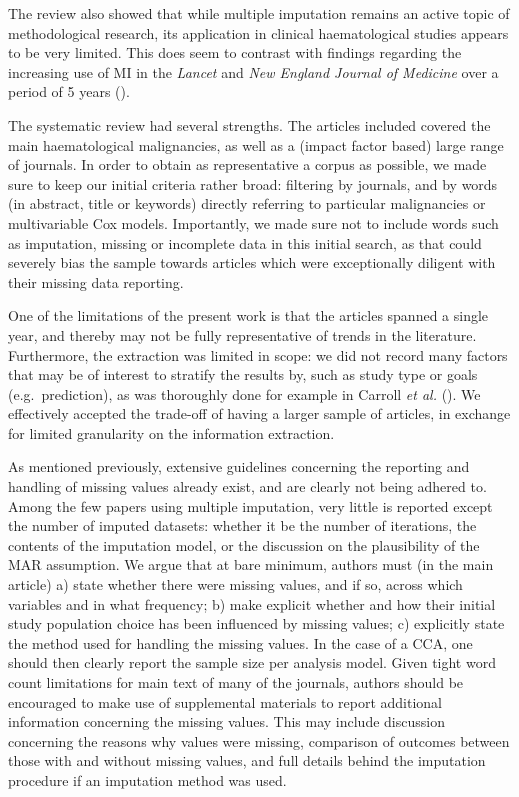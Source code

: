 \documentclass[
  letterpaper,
  paper=240mm:170mm,
  twoside=true,
  open=right,
  fontsize=10pt,
  pagesize=false,
  BCOR=15mm,
  DIV=14,
  headinclude=true,
  footinclude=false,
  headsepline=on]{scrbook}
\begin{document}
The review also showed that while multiple imputation remains an active
topic of methodological research, its application in clinical
haematological studies appears to be very limited. This does seem to
contrast with findings regarding the increasing use of MI in the
\emph{Lancet} and \emph{New England Journal of Medicine} over a period
of 5 years ().

The systematic review had several strengths. The articles included
covered the main haematological malignancies, as well as a (impact
factor based) large range of journals. In order to obtain as
representative a corpus as possible, we made sure to keep our initial
criteria rather broad: filtering by journals, and by words (in abstract,
title or keywords) directly referring to particular malignancies or
multivariable Cox models. Importantly, we made sure not to include words
such as imputation, missing or incomplete data in this initial search,
as that could severely bias the sample towards articles which were
exceptionally diligent with their missing data reporting.

One of the limitations of the present work is that the articles spanned
a single year, and thereby may not be fully representative of trends in
the literature. Furthermore, the extraction was limited in scope: we did
not record many factors that may be of interest to stratify the results
by, such as study type or goals (e.g.~prediction), as was thoroughly
done for example in Carroll \emph{et al.}
(). We effectively accepted
the trade-off of having a larger sample of articles, in exchange for
limited granularity on the information extraction.

As mentioned previously, extensive guidelines concerning the reporting
and handling of missing values already exist, and are clearly not being
adhered to. Among the few papers using multiple imputation, very little
is reported except the number of imputed datasets: whether it be the
number of iterations, the contents of the imputation model, or the
discussion on the plausibility of the MAR assumption. We argue that at
bare minimum, authors must (in the main article) a) state whether there
were missing values, and if so, across which variables and in what
frequency; b) make explicit whether and how their initial study
population choice has been influenced by missing values; c) explicitly
state the method used for handling the missing values. In the case of a
CCA, one should then clearly report the sample size per analysis model.
Given tight word count limitations for main text of many of the
journals, authors should be encouraged to make use of supplemental
materials to report additional information concerning the missing
values. This may include discussion concerning the reasons why values
were missing, comparison of outcomes between those with and without
missing values, and full details behind the imputation procedure if an
imputation method was used.
\end{document}
